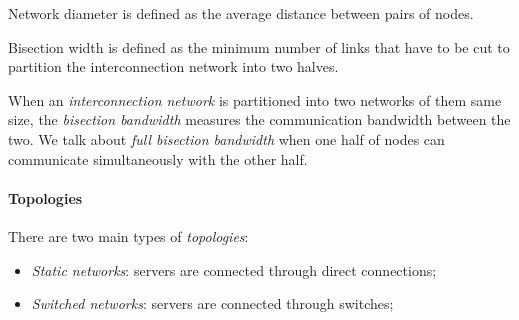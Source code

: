 \begin{definition}
    Network diameter is defined as the average distance between pairs of
    nodes.
\end{definition}
\begin{definition}
    Bisection width is defined as the minimum number of links that have to be
    cut to partition the interconnection network into two halves.
\end{definition}

\noindent
When an \emph{interconnection network} is partitioned into two networks of
them same size, the \emph{bisection bandwidth} measures the communication
bandwidth between the two. We talk about \emph{full bisection bandwidth} when
one half of nodes can communicate simultaneously with the other half.

\paragraph{Topologies}
There are two main types of \emph{topologies}:
\begin{itemize}
    \item \emph{Static networks}: servers are connected through direct connections;
    \item \emph{Switched networks}: servers are connected through switches;
\end{itemize}

